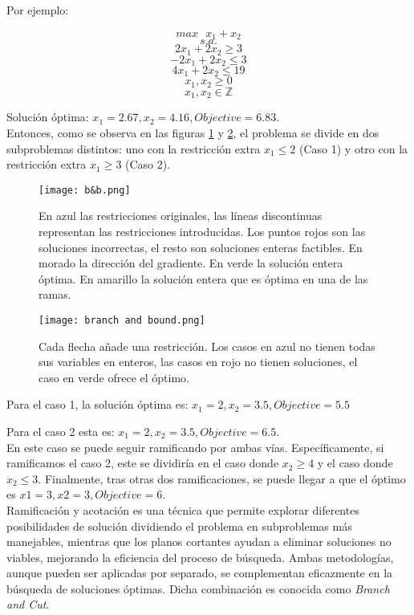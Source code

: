 \documentclass[12pt]{report}
\begin{document}
Por ejemplo:

$$max \text{ } x_1 + x_2$$
$$s.a.$$
$$2x_1 + 2x_2 \geq  3$$
$$-2x_1 + 2x_2 \leq  3$$
$$4x_1 + 2x_2 \leq  19$$
$$x_1, x_2 \geq  0$$
$$x_1, x_2 \in \mathbb{Z}$$

Solución óptima: $x_1=2.67, x_2=4.16, Objective=6.83$.\\

Entonces, como se observa en las figuras \ref{fig:b&b} y \ref{fig:branch and bound}, el problema se divide en dos subproblemas distintos: uno con la restricción extra $x_1\leq 2$ (Caso 1) y otro con la restricción extra $x_1\geq 3$ (Caso 2).\\

\begin{figure}[ht]
    \centering
    \texttt{[image: b\&b.png]}
    \caption{En azul las restricciones originales, las líneas discontinuas representan las restricciones introducidas. Los puntos rojos son las soluciones incorrectas, el resto son soluciones enteras factibles. En morado la dirección del gradiente. En verde la solución entera óptima. En amarillo la solución entera que es óptima en una de las ramas.}
    \label{fig:b&b}
\end{figure}

\begin{figure}[ht]
    \centering
    \texttt{[image: branch and bound.png]}
    \caption{Cada flecha añade una restricción. Los casos en azul no tienen todas sus variables en enteros, las casos en rojo no tienen soluciones, el caso en verde ofrece el óptimo.}
    \label{fig:branch and bound}
\end{figure}

Para el caso 1, la solución óptima es: $x_1=2, x_2=3.5, Objective=5.5$

Para el caso 2 esta es: $x_1=2, x_2=3.5, Objective=6.5$.\\

En este caso se puede seguir ramificando por ambas vías. Específicamente, si ramificamos el caso 2, este se dividiría en el caso donde $x_2\geq 4$ y el caso donde $x_2\leq 3$. Finalmente, tras otras dos ramificaciones, se puede llegar a que el óptimo es $x1=3, x2=3, Objective=6$.\\

Ramificación y acotación es una técnica que permite explorar diferentes posibilidades de solución dividiendo el problema en subproblemas más manejables, mientras que los planos cortantes ayudan a eliminar soluciones no viables, mejorando la eficiencia del proceso de búsqueda. Ambas metodologías, aunque pueden ser aplicadas por separado, se complementan eficazmente en la búsqueda de soluciones óptimas. Dicha combinación es conocida como \textit{Branch and Cut}. 
\end{document}
